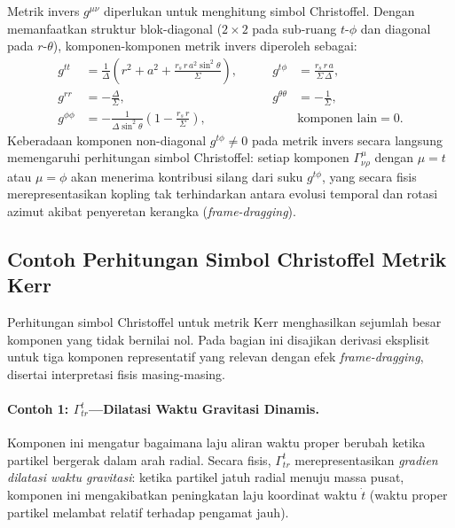 Metrik invers $g^{\mu\nu}$ diperlukan untuk menghitung simbol Christoffel. Dengan memanfaatkan struktur blok-diagonal ($2 \times 2$ pada sub-ruang $t$-$\phi$ dan diagonal pada $r$-$\theta$), komponen-komponen metrik invers diperoleh sebagai:
\begin{equation}
\begin{aligned}
    g^{tt} &= \frac{1}{\Delta}\left(r^2 + a^2 + \frac{r_s\, r\, a^2 \sin^2\!\theta}{\Sigma}\right), &\qquad
    g^{t\phi} &= \frac{r_s\, r\, a}{\Sigma\,\Delta}, \\[6pt]
    g^{rr} &= -\frac{\Delta}{\Sigma}, &\qquad
    g^{\theta\theta} &= -\frac{1}{\Sigma}, \\[6pt]
    g^{\phi\phi} &= -\frac{1}{\Delta\sin^2\!\theta}\left(1 - \frac{r_s\, r}{\Sigma}\right), &\qquad
    & \text{komponen lain} = 0.
\end{aligned}
    \label{eq:kerr-inverse}
\end{equation}
Keberadaan komponen non-diagonal $g^{t\phi} \neq 0$ pada metrik invers secara langsung memengaruhi perhitungan simbol Christoffel: setiap komponen $\Gamma^\mu_{\nu\rho}$ dengan $\mu = t$ atau $\mu = \phi$ akan menerima kontribusi silang dari suku $g^{t\phi}$, yang secara fisis merepresentasikan kopling tak terhindarkan antara evolusi temporal dan rotasi azimut akibat penyeretan kerangka (\textit{frame-dragging}).


\subsection{Contoh Perhitungan Simbol Christoffel Metrik Kerr}
\label{subsec:christoffel-kerr-contoh}

Perhitungan simbol Christoffel untuk metrik Kerr menghasilkan sejumlah besar komponen yang tidak bernilai nol. Pada bagian ini disajikan derivasi eksplisit untuk tiga komponen representatif yang relevan dengan efek \textit{frame-dragging}, disertai interpretasi fisis masing-masing.

\paragraph{Contoh 1: $\Gamma^t_{tr}$---Dilatasi Waktu Gravitasi Dinamis.}
Komponen ini mengatur bagaimana laju aliran waktu proper berubah ketika partikel bergerak dalam arah radial. Secara fisis, $\Gamma^t_{tr}$ merepresentasikan \textit{gradien dilatasi waktu gravitasi}: ketika partikel jatuh radial menuju massa pusat, komponen ini mengakibatkan peningkatan laju koordinat waktu $\dot{t}$ (waktu proper partikel melambat relatif terhadap pengamat jauh).

